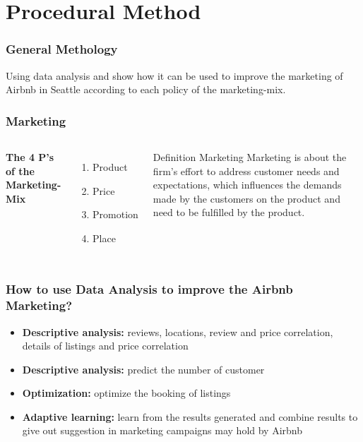 \documentclass{beamer}
\begin{document}
\section{Procedural Method}
\begin{frame}
\frametitle{General Methology}
Using data analysis and show how it can be used to improve the marketing of Airbnb in Seattle according to each policy of the marketing-mix.
\end{frame}
%
%
\begin{frame}
\frametitle{Marketing}
\begin{columns}[c] %

\textbf{The 4 P's of the Marketing-Mix}
\begin{enumerate}
\item Product
\item Price
\item Promotion
\item Place
\end{enumerate}


\begin{block}{Definition Marketing}
Marketing is about the firm’s effort to address customer needs and expectations, which influences the demands made by the customers on the product and need to be fulfilled by the product.
\end{block}
\end{columns}
\end{frame}


\begin{frame}
\frametitle{How to use Data Analysis to improve the Airbnb Marketing?}
\begin{itemize}
\item \textbf{Descriptive analysis:} reviews, locations, review and price correlation, details of listings and price correlation
\item \textbf{Descriptive analysis:} predict the number of customer
\item \textbf{Optimization:} optimize the booking of listings 
\item \textbf{Adaptive learning:} learn from the results generated and combine results to give out suggestion in marketing campaigns may hold by Airbnb
\end{itemize}
\end{frame}
\end{document}
